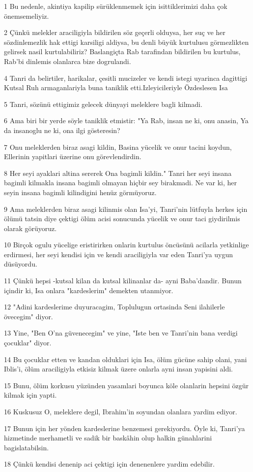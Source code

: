 \par 1 Bu nedenle, akintiya kapilip sürüklenmemek için isittiklerimizi daha çok önemsemeliyiz.
\par 2 Çünkü melekler araciligiyla bildirilen söz geçerli olduysa, her suç ve her sözdinlemezlik hak ettigi karsiligi aldiysa, bu denli büyük kurtulusu görmezlikten gelirsek nasil kurtulabiliriz? Baslangiçta Rab tarafindan bildirilen bu kurtulus, Rab'bi dinlemis olanlarca bize dogrulandi.
\par 4 Tanri da belirtiler, harikalar, çesitli mucizeler ve kendi istegi uyarinca dagittigi Kutsal Ruh armaganlariyla buna taniklik etti.Izleyicileriyle Özdeslesen Isa
\par 5 Tanri, sözünü ettigimiz gelecek dünyayi meleklere bagli kilmadi.
\par 6 Ama biri bir yerde söyle taniklik etmistir: "Ya Rab, insan ne ki, onu anasin, Ya da insanoglu ne ki, ona ilgi gösteresin?
\par 7 Onu meleklerden biraz asagi kildin, Basina yücelik ve onur tacini koydun, Ellerinin yapitlari üzerine onu görevlendirdin.
\par 8 Her seyi ayaklari altina sererek Ona bagimli kildin." Tanri her seyi insana bagimli kilmakla insana bagimli olmayan hiçbir sey birakmadi. Ne var ki, her seyin insana bagimli kilindigini henüz görmüyoruz.
\par 9 Ama meleklerden biraz asagi kilinmis olan Isa'yi, Tanri'nin lütfuyla herkes için ölümü tatsin diye çektigi ölüm acisi sonucunda yücelik ve onur taci giydirilmis olarak görüyoruz.
\par 10 Birçok ogulu yücelige eristirirken onlarin kurtulus öncüsünü acilarla yetkinlige erdirmesi, her seyi kendisi için ve kendi araciligiyla var eden Tanri'ya uygun düsüyordu.
\par 11 Çünkü hepsi -kutsal kilan da kutsal kilinanlar da- ayni Baba'dandir. Bunun içindir ki, Isa onlara "kardeslerim" demekten utanmiyor.
\par 12 "Adini kardeslerime duyuracagim, Toplulugun ortasinda Seni ilahilerle övecegim" diyor.
\par 13 Yine, "Ben O'na güvenecegim" ve yine, "Iste ben ve Tanri'nin bana verdigi çocuklar" diyor.
\par 14 Bu çocuklar etten ve kandan olduklari için Isa, ölüm gücüne sahip olani, yani Iblis'i, ölüm araciligiyla etkisiz kilmak üzere onlarla ayni insan yapisini aldi.
\par 15 Bunu, ölüm korkusu yüzünden yasamlari boyunca köle olanlarin hepsini özgür kilmak için yapti.
\par 16 Kuskusuz O, meleklere degil, Ibrahim'in soyundan olanlara yardim ediyor.
\par 17 Bunun için her yönden kardeslerine benzemesi gerekiyordu. Öyle ki, Tanri'ya hizmetinde merhametli ve sadik bir baskâhin olup halkin günahlarini bagislatabilsin.
\par 18 Çünkü kendisi denenip aci çektigi için denenenlere yardim edebilir.


